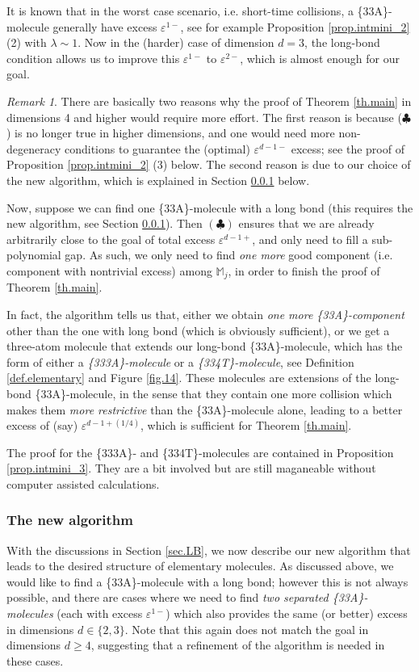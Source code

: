 \documentclass[10pt, reqno]{amsart}
\newcommand{\Mb}{\mathbb M}
\theoremstyle{definition}
\theoremstyle{remark}
\newtheorem{remark}[theorem]{Remark}
\numberwithin{equation}{section}
\begin{document}
It is known that in the worst case scenario, i.e. short-time collisions, a \{33A\}-molecule generally have excess $\varepsilon^{1-}$, see for example Proposition \ref{prop.intmini_2} (2) with $\lambda\sim 1$. Now in the (harder) case of dimension $d=3$, the long-bond condition allows us to improve this $\varepsilon^{1-}$ to $\varepsilon^{2-}$, which is almost enough for our goal.
\begin{remark}
\label{rem.4d} There are basically two reasons why the proof of Theorem \ref{th.main} in dimensions 4 and higher would require more effort. The first reason is because ($\clubsuit$) is no longer true in higher dimensions, and one would need more non-degeneracy conditions to guarantee the (optimal) $\varepsilon^{d-1-}$ excess; see the proof of Proposition \ref{prop.intmini_2} (3) below. The second reason is due to our choice of the new algorithm, which is explained in Section \ref{sec.new_alg} below.
\end{remark}
Now, suppose we can find one \{33A\}-molecule with a long bond (this requires the new algorithm, see Section \ref{sec.new_alg}). Then $(\clubsuit)$ ensures that we are already arbitrarily close to the goal of total excess $\varepsilon^{d-1+}$, and only need to fill a sub-polynomial gap. As such, we only need to find \emph{one more} good component (i.e. component with nontrivial excess) among $\Mb_j$, in order to finish the proof of Theorem \ref{th.main}.

In fact, the algorithm tells us that, either we obtain \emph{one more \{33A\}-component} other than the one with long bond (which is obviously sufficient), or we get a three-atom molecule that extends our long-bond \{33A\}-molecule, which has the form of either a \emph{\{333A\}-molecule} or a \emph{\{334T\}-molecule}, see Definition \ref{def.elementary} and Figure \ref{fig.14}. These molecules are extensions of the long-bond \{33A\}-molecule, in the sense that they contain one more collision which makes them \emph{more restrictive} than the \{33A\}-molecule alone, leading to a better excess of (say) $\varepsilon^{d-1+(1/4)}$, which is sufficient for Theorem \ref{th.main}.

The proof for the \{333A\}- and \{334T\}-molecules are contained in Proposition \ref{prop.intmini_3}. They are a bit involved but are still maganeable without computer assisted calculations.
\subsubsection{The new algorithm}\label{sec.new_alg} With the discussions in Section \ref{sec.LB}, we now describe our new algorithm that leads to the desired structure of elementary molecules. As discussed above, we would like to find a \{33A\}-molecule with a long bond; however this is not always possible, and there are cases where we need to find \emph{two separated \{33A\}-molecules} (each with excess $\varepsilon^{1-}$) which also provides the same (or better) excess in dimensions $d\in\{2,3\}$. Note that this again does not match the goal in dimensions $d\geq 4$, suggesting that a refinement of the algorithm is needed in these cases.
\end{document}
